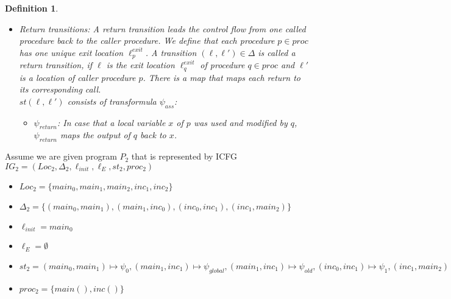 \documentclass{article}
\newtheorem{mydef}{Definition}
\begin{document}
\begin{mydef}
\begin{itemize}
			\item Return transitions: A return transition leads the control flow from one called procedure back to the caller procedure. We define that each procedure $p \in proc$ has one unique exit location $\ell^{exit}_p$. A transition $(\ell, \ell') \in \Delta$ is called a return transition, if $\ell$ is the exit location $\ell_q^{exit}$ of procedure $q \in proc$ and $\ell'$ is a location of caller procedure $p$. There is a map that maps each return to its corresponding call. \\
			$st(\ell, \ell')$ consists of transformula $\psi_{ass}$:
			\begin{itemize}
				\item $\psi_{return}$: In case that a local variable $x$ of $p$ was used and modified by $q$, $\psi_{return}$ maps the output of $q$ back to $x$.
			\end{itemize}
		\end{itemize}
	\end{mydef}
	
	Assume we are given program $P_2$ that is represented by ICFG $IG_2 = (Loc_2, \Delta_2, \ell_{init}, \ell_E, st_2, proc_2)$
	\begin{itemize}
		\item  $Loc_2= \{ main_0, main_1,  main_2, inc_1, inc_2 \} $
		\item $\Delta_2 = \{ (main_0, main_1), ( main_1, inc_0), (inc_0, inc_1), (inc_1, main_2)\}$
		\item $\ell_{init} = main_0$ 
		\item $\ell_E = \emptyset$
		\item $st_2 = (main_0, main_1) \mapsto \psi_0, (main_1, inc_1) \mapsto \psi_{global}, (main_1, inc_1) \mapsto \psi_{old}, (inc_0, inc_1) \mapsto \psi_1,  (inc_1, main_2) \mapsto \psi_{return})$
		\item $proc_2 = \{ main(), inc()\}$
	\end{itemize} 
	\bigskip
	
\end{document}
